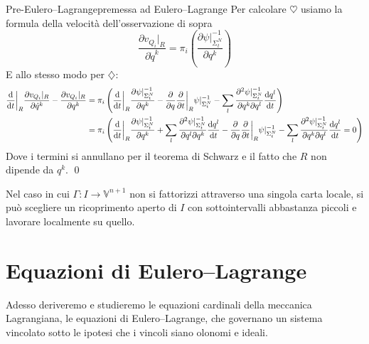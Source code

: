 \documentclass[openany]{book}
\renewcommand\V{\mathbb{V}}
\begin{document}
\begin{proposition}{Pre-Eulero--Lagrange}{premessa ad Eulero--Lagrange}
    Per calcolare $\heartsuit$ usiamo la formula della velocità dell'osservazione di sopra 
    \[ \frac{\partial v_{Q_i}|_R}{\partial \dot q^k} = \pi_i\left( \frac{\partial \psi|_{\Sigma_t^N}^{-1}}{\partial q^k} \right) \]
    E allo stesso modo per $\diamondsuit$:
    \begin{align*}
        \frac{\text{d}}{\text{d} t}\bigg|_R \frac{\partial v_{Q_i}|_R}{\partial \dot q^k} - \frac{\partial v_{Q_i}|_R}{\partial q^k} & = \pi_i\left( \frac{\text{d}}{\text{d} t}\bigg|_R \frac{\partial \psi|_{\Sigma_t^N}^{-1}}{\partial q^k} - \frac{\partial}{\partial q}\frac{\partial }{\partial t}\bigg|_R \psi|_{\Sigma_t^N}^{-1} -\sum_l \frac{\partial^2 \psi|_{\Sigma_t^N}^{-1}}{\partial q^k \partial q^l} \frac{\text{d} q^l}{\text{d} t} \right) \\
        & = \pi_i\left( \frac{\text{d}}{\text{d} t}\bigg|_R \frac{\partial \psi|_{\Sigma_t^N}^{-1}}{\partial q^k} + \sum_l \frac{\partial^2 \psi|_{\Sigma_t^N}^{-1}}{\partial q^l \partial q^k} \frac{\text{d} q^l}{\text{d} t} - \frac{\partial}{\partial q}\frac{\partial }{\partial t}\bigg|_R \psi|_{\Sigma_t^N}^{-1} -\sum_l \frac{\partial^2 \psi|_{\Sigma_t^N}^{-1}}{\partial q^k \partial q^l} \frac{\text{d} q^l}{\text{d} t} = 0 \right)
    \end{align*}
    Dove i termini si annullano per il teorema di Schwarz e il fatto che $R$ non dipende da $q^k$.
    \qed
\end{proposition}

Nel caso in cui $\Gamma: I\to\V^{n+1}$ non si fattorizzi attraverso una singola carta locale, si può scegliere un ricoprimento aperto di $I$ con sottointervalli abbastanza piccoli e lavorare localmente su quello.

\newpage
\section{Equazioni di Eulero--Lagrange}

Adesso deriveremo e studieremo le equazioni cardinali della meccanica Lagrangiana, le equazioni di Eulero--Lagrange, che governano un sistema vincolato sotto le ipotesi che i vincoli siano olonomi e ideali.
\end{document}
